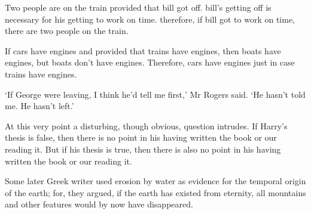 \begin{enumerate}
\begin{statement}{Two people are on the train provided that bill got off. bill's
    getting off is necessary for his getting to work on time. therefore, if bill
    got to work on time, there are two people on the train.}
\end{statement}

\begin{statement}{If cars have engines and provided that trains have engines,
    then boats have engines, but boats don't have engines. Therefore, cars have
    engines just in case trains have engines.}
\end{statement}

\begin{statement}{‘If George were leaving, I think he'd tell me first,' Mr
    Rogers said. ‘He hasn't told me. He hasn't left.'}
\end{statement}

\begin{statement}{At this very point a disturbing, though obvious, question
    intrudes. If Harry's thesis is false, then there is no point in his having
    written the book or our reading it. But if his thesis is true, then there is
    also no point in his having written the book or our reading it.}
\end{statement}

\begin{statement}{Some later Greek writer used erosion by water as evidence for
    the temporal origin of the earth; for, they argued, if the earth has
    existed from eternity, all mountains and other features would by now have
    disappeared.}
\end{statement}
\end{enumerate}

% 
